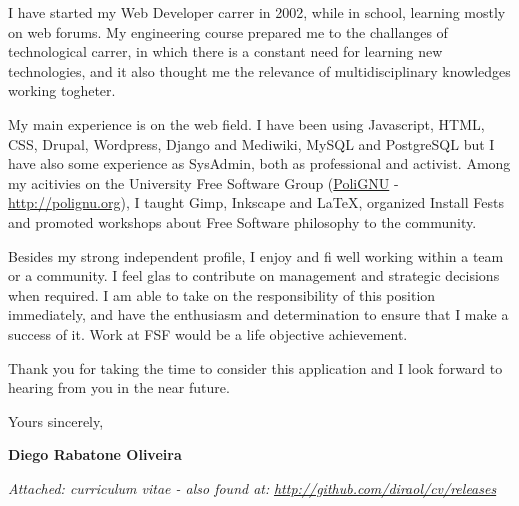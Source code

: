 \documentclass[]{friggeri-cover-letter}
\begin{document}
I have started my Web Developer carrer in 2002, while in school, learning mostly on web forums. My engineering course prepared me to the challanges of technological carrer, in which there is a constant need for learning new technologies, and it also thought me the relevance of multidisciplinary knowledges working togheter.

My main experience is on the web field. I have been using Javascript, HTML, CSS, Drupal, Wordpress, Django and Mediwiki, MySQL and PostgreSQL but I have also some experience as SysAdmin, both as professional and activist.
Among my acitivies on the University Free Software Group (\href{http://polignu.org}{PoliGNU} - \url{http://polignu.org}), I taught Gimp, Inkscape and LaTeX, organized Install Fests and promoted workshops about Free Software philosophy to the community.

Besides my strong independent profile, I enjoy and fi well working within a team or a community. I feel glas to contribute on management and strategic decisions when required. I am able to take on the responsibility of this position immediately, and have the enthusiasm and determination to ensure that I make a success of it. Work at FSF would be a life objective achievement.

Thank you for taking the time to consider this application and I look forward to hearing from you in the near future.

\vfill

\hfill Yours sincerely,

\hfill \textbf{Diego Rabatone Oliveira}

\vfill

\footnotesize{\thinfont\color{lightgray}\textit{Attached: curriculum vitae - also found at:} \textit{\url{http://github.com/diraol/cv/releases}}}
\end{document}
